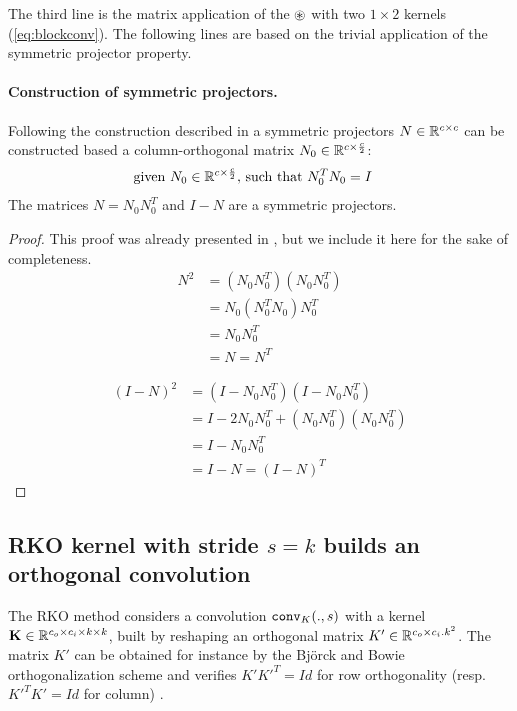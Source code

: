         The third line is the matrix application of the $\circledast$  with two $1\times 2$ kernels (\cref{eq:blockconv}). The following lines are based on the trivial application of the symmetric projector property.

        \paragraph{Construction of symmetric projectors.}  Following the construction described in \cite{li_preventing_2019} a symmetric projectors $N \in \mathbb{R}^{c\times c}$ can be constructed based a column-orthogonal matrix $N_0 \in \mathbb{R}^{c\times \frac{c}{2}}$:
        \begin{align*}
            \text{given }& N_0 \in \mathbb{R}^{c\times \frac{c}{2}} \text{, such that }  N_0^T N_0 = I 
        \end{align*}
        The matrices $N = N_0 N_0^T$ and $I-N$ are a symmetric projectors.

    \begin{proof}
        This proof was already presented in \cite{li_preventing_2019}, but we include it here for the sake of completeness.
        \begin{align*}
        N^2 &=(N_0 N_0^T)(N_0 N_0^T) \\
        &= N_0(N_0^TN_0)N_0^T \\
        &= N_0N_0^T\\
        &=N=N^T
        \end{align*}
        
        \begin{align*}
        (I-N)^2 &=(I-N_0 N_0^T)(I-N_0 N_0^T) \\
        &= I -2N_0N_0^T + (N_0N_0^T)(N_0N_0^T) \\
        &= I-N_0N_0^T\\
        &=I-N=(I-N)^T
        \end{align*}
    \end{proof}

    \subsection{RKO kernel with stride \texorpdfstring{$s=k$}{s=k} builds an orthogonal convolution}\label{sec:ap_proof_rko}
    The RKO method considers a convolution $\mathtt{conv}_{K}(., s)$ with a kernel $\mathbf{K}\in\mathbb{R}^{c_o\times c_i\times k\times k}$, built by reshaping an orthogonal matrix $K'\in\mathbb{R}^{c_o\times c_i.k^2}$. The matrix $K'$ can be obtained for instance by  the Björck and Bowie orthogonalization scheme \cite{bjorck1971iterative} and verifies $K'K'^T=Id$ for row orthogonality (resp. $K'^TK'=Id$ for column) .
    
